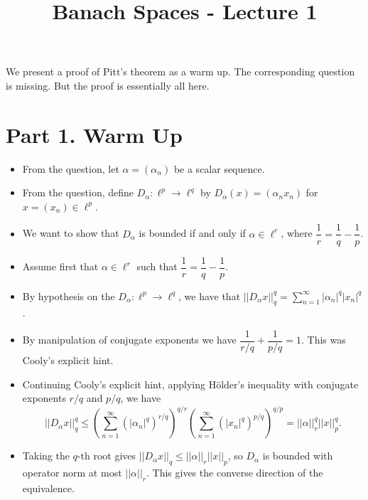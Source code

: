 \documentclass[10pt]{article}
\title{Banach Spaces - Lecture 1}
\author{}
\date{}
\begin{document}
\maketitle


We present a proof of Pitt's theorem as a warm up.
The corresponding question is missing. But the proof is essentially all here.

\section*{Part 1. Warm Up}

\begin{itemize}
    

\item  From the question, let $\alpha = (\alpha_n)$ be a scalar sequence.

\item From the question, define $D_\alpha: \ell^p \rightarrow \ell^q$ by $D_\alpha(x) = (\alpha_n x_n)$ for $x = (x_n) \in \ell^p$.

\item We want to show that $D_\alpha$ is bounded if and only if $\alpha \in \ell^r$, where $\dfrac{1}{r} = \dfrac{1}{q} - \dfrac{1}{p}$.

\item Assume first that $\alpha \in \ell^r$ such that $\dfrac{1}{r} = \dfrac{1}{q} - \dfrac{1}{p}$.

\item By hypothesis on the $D_\alpha: \ell^p \rightarrow \ell^q$, we have that $||D_\alpha x||^q_q = \sum_{n=1}^\infty |\alpha_n|^q |x_n|^q$.

\item By manipulation of conjugate exponents we have $\dfrac{1}{r/q} + \dfrac{1}{p/q} = 1$. This was Cooly's explicit hint.

\item Continuing Cooly's explicit hint, applying H\"older's inequality with conjugate exponents $r/q$ and $p/q$, we have
\[||D_\alpha x||^q_q \leq \left( \sum_{n=1}^\infty (|\alpha_n|^q)^{r/q} \right)^{q/r} \left( \sum_{n=1}^\infty (|x_n|^q)^{p/q} \right)^{q/p} = ||\alpha||^q_r ||x||^q_p.\]

\item Taking the $q$-th root gives $||D_\alpha x||_q \leq ||\alpha||_r ||x||_p$, so $D_\alpha$ is bounded with operator norm at most $||\alpha||_r$. This gives the converse direction of the equivalence.


\end{itemize}
\end{document}
